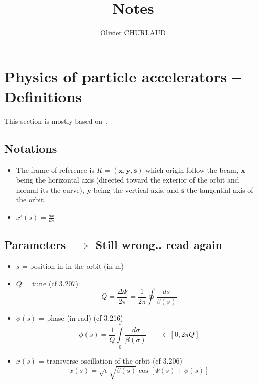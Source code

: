 \documentclass[12pt,a4paper]{article}
\author{Olivier CHURLAUD}
\title{Notes}
\begin{document}
	\maketitle
	\section{Physics of particle accelerators -- Definitions}
	This section is mostly based on~\cite{book:wille}.
	
	\subsection{Notations}
	\begin{itemize}
		\item The frame of reference is $K = (\mathbf{x},\mathbf{y},\mathbf{s})$ which origin follow the beam, $\mathbf{x}$ being the horizontal axis (directed toward the exterior of the orbit and normal its the curve), $\mathbf{y}$ being the vertical axis, and $\mathbf{s}$ the tangential axis of the orbit.
		\item $x'(s) = \frac{dx}{ds}$
	\end{itemize}
	
	\subsection{Parameters $\implies$ Still wrong.. read again}
	\begin{itemize}
		\item $s$ = position in in the orbit (in m)
		\item $Q$ = tune (cf 3.207)
		\begin{equation}
			Q = \frac{\Delta \Psi}{2 \pi}= \frac{1}{2 \pi} \oint \frac{ds}{\beta(s)}
		\end{equation}
		
		\item $\phi(s)$ = phase (in rad)  (cf 3.216)
		\begin{equation}
			\phi(s) = \frac{1}{Q} \int\limits_{0}^s \frac{d\sigma}{\beta(\sigma)} \qquad \in [0, 2 \pi Q]
		\end{equation}
		
		\item $x(s)$ = transverse oscillation of the orbit (cf 3.206) 
		\begin{equation}
			x(s) = \sqrt{\epsilon}\sqrt{\beta(s)}\cos[\Psi(s)+\phi(s)]
		\end{equation}
	\end{itemize}
\end{document}
